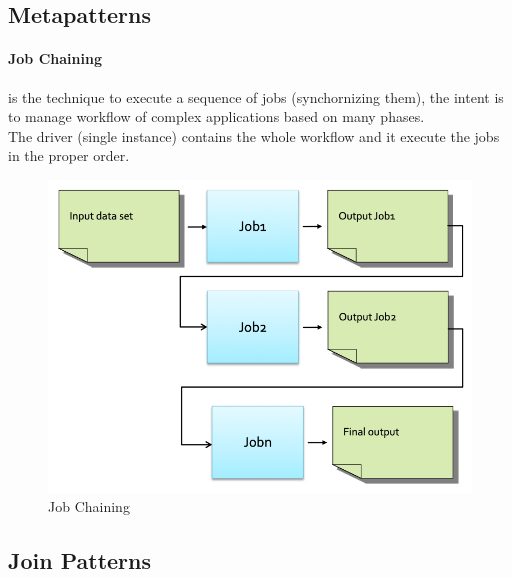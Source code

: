 \documentclass[12pt]{article}
\begin{document}
\subsection{Metapatterns}
\paragraph{Job Chaining} is the technique to execute a sequence of jobs (synchornizing them), the intent is to manage workflow of complex applications based on many phases.\\
The driver (single instance) contains the whole workflow and it execute the jobs in the proper order.
\begin{figure}[H]
  \includegraphics[width=\linewidth]{images/chaining.png}
  \caption{Job Chaining}
  \label{fig:chaining}
\end{figure}

\subsection{Join Patterns}
\end{document}
